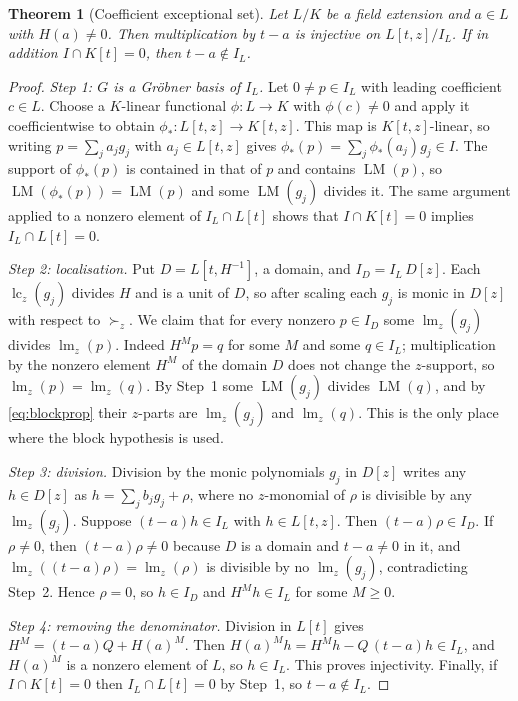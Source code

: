 \documentclass[11pt,a4paper]{article}
\theoremstyle{plain}
\newtheorem{theorem}{Theorem}[section]
\theoremstyle{definition}
\theoremstyle{remark}
\newcommand{\lc}{\operatorname{lc}}
\newcommand{\lmz}{\operatorname{lm}}
\newcommand{\LM}{\operatorname{LM}}
\begin{document}
\begin{theorem}[Coefficient exceptional set]\label{thm:block}
Let $L/K$ be a field extension and $a\in L$ with $H(a)\neq0$. Then multiplication by $t-a$ is injective on $L[t,z]/I_L$. If in addition $I\cap K[t]=0$, then $t-a\notin I_L$.
\end{theorem}
\begin{proof}
\emph{Step 1: $G$ is a Gr\"obner basis of $I_L$.} Let $0\neq p\in I_L$ with leading coefficient $c\in L$. Choose a $K$-linear functional $\phi\colon L\to K$ with $\phi(c)\neq0$ and apply it coefficientwise to obtain $\phi_*\colon L[t,z]\to K[t,z]$. This map is $K[t,z]$-linear, so writing $p=\sum_ja_jg_j$ with $a_j\in L[t,z]$ gives $\phi_*(p)=\sum_j\phi_*(a_j)g_j\in I$. The support of $\phi_*(p)$ is contained in that of $p$ and contains $\LM(p)$, so $\LM(\phi_*(p))=\LM(p)$ and some $\LM(g_j)$ divides it. The same argument applied to a nonzero element of $I_L\cap L[t]$ shows that $I\cap K[t]=0$ implies $I_L\cap L[t]=0$.

\emph{Step 2: localisation.} Put $D=L[t,H^{-1}]$, a domain, and $I_D=I_L\,D[z]$. Each $\lc_z(g_j)$ divides $H$ and is a unit of $D$, so after scaling each $g_j$ is monic in $D[z]$ with respect to $\succ_z$. We claim that for every nonzero $p\in I_D$ some $\lmz_z(g_j)$ divides $\lmz_z(p)$. Indeed $H^Mp=q$ for some $M$ and some $q\in I_L$; multiplication by the nonzero element $H^M$ of the domain $D$ does not change the $z$-support, so $\lmz_z(p)=\lmz_z(q)$. By Step~1 some $\LM(g_j)$ divides $\LM(q)$, and by \eqref{eq:blockprop} their $z$-parts are $\lmz_z(g_j)$ and $\lmz_z(q)$. This is the only place where the block hypothesis is used.

\emph{Step 3: division.} Division by the monic polynomials $g_j$ in $D[z]$ writes any $h\in D[z]$ as $h=\sum_jb_jg_j+\rho$, where no $z$-monomial of $\rho$ is divisible by any $\lmz_z(g_j)$. Suppose $(t-a)h\in I_L$ with $h\in L[t,z]$. Then $(t-a)\rho\in I_D$. If $\rho\neq0$, then $(t-a)\rho\neq0$ because $D$ is a domain and $t-a\neq0$ in it, and $\lmz_z((t-a)\rho)=\lmz_z(\rho)$ is divisible by no $\lmz_z(g_j)$, contradicting Step~2. Hence $\rho=0$, so $h\in I_D$ and $H^Mh\in I_L$ for some $M\ge0$.

\emph{Step 4: removing the denominator.} Division in $L[t]$ gives $H^M=(t-a)Q+H(a)^M$. Then $H(a)^Mh=H^Mh-Q\,(t-a)h\in I_L$, and $H(a)^M$ is a nonzero element of $L$, so $h\in I_L$. This proves injectivity. Finally, if $I\cap K[t]=0$ then $I_L\cap L[t]=0$ by Step~1, so $t-a\notin I_L$.
\end{proof}
\end{document}
